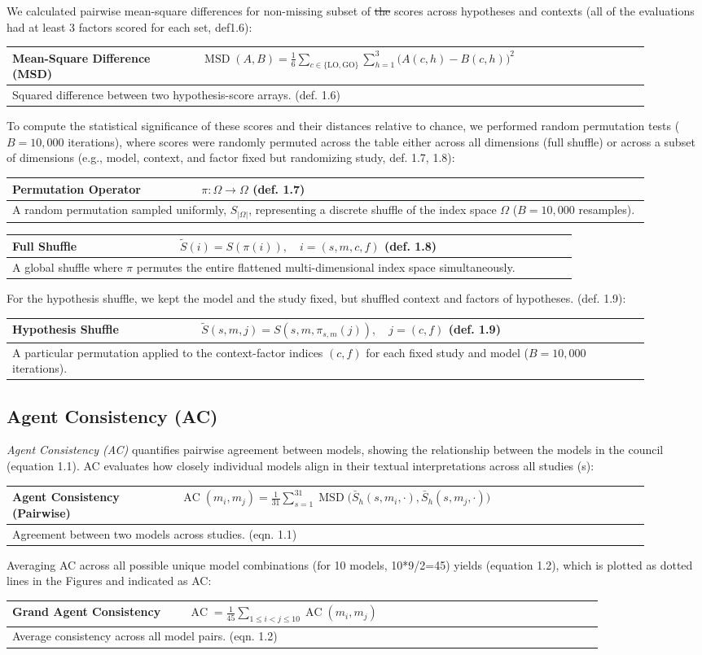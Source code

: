 \documentclass[12pt]{article}
\makeatletter
\renewcommand{\arraystretch}{1.06}
\newcommand{\EquationBox}[3]{%
  \begin{center}
  \begingroup
  \small
  \setlength{\tabcolsep}{6pt}%
  \renewcommand{\arraystretch}{1.18}%
  \begin{tabular}{|p{0.27\linewidth}|p{0.64\linewidth}|}
  \hline
  \textbf{#1} & #2 \\
  \hline
  \multicolumn{2}{|p{0.94\linewidth}|}{#3} \\
  \hline
  \end{tabular}
  \endgroup
  \end{center}
}
\newcommand{\EquationBoxWideLeft}[3]{%
  \begin{center}
  \begingroup
  \small
  \setlength{\tabcolsep}{6pt}%
  \renewcommand{\arraystretch}{1.18}%
  \begin{tabular}{|p{0.24\linewidth}|p{0.67\linewidth}|}
  \hline
  \textbf{#1} & #2 \\
  \hline
  \multicolumn{2}{|p{0.94\linewidth}|}{#3} \\
  \hline
  \end{tabular}
  \endgroup
  \end{center}
}
\providecommand{\DIFaddtex}[1]{{\protect\color{blue}\uwave{#1}}} %
\providecommand{\DIFdeltex}[1]{{\protect\color{red}\sout{#1}}} %
\providecommand{\DIFaddbegin}{} %
\providecommand{\DIFaddend}{} %
\providecommand{\DIFdelbegin}{} %
\providecommand{\DIFdelend}{} %
\providecommand{\DIFadd}[1]{\texorpdfstring{\DIFaddtex{#1}}{#1}} %
\providecommand{\DIFdel}[1]{\texorpdfstring{\DIFdeltex{#1}}{}} %
\providecommand{\DIFscaledelfig}{0.5}
\newlength{\DIFdelgraphicswidth} %
\newlength{\DIFdelgraphicsheight} %
\providecommand{\DIFaddincludegraphics}[2][]{{\color{blue}\fbox{\DIFOincludegraphics[#1]{#2}}}} %
\providecommand{\DIFdelincludegraphics}[2][]{%
\sbox{\DIFdelgraphicsbox}{\DIFOincludegraphics[#1]{#2}}%
\settoboxwidth{\DIFdelgraphicswidth}{\DIFdelgraphicsbox} %
\settoboxtotalheight{\DIFdelgraphicsheight}{\DIFdelgraphicsbox} %
\scalebox{\DIFscaledelfig}{%
\parbox[b]{\DIFdelgraphicswidth}{\usebox{\DIFdelgraphicsbox}\\[-\baselineskip] \rule{\DIFdelgraphicswidth}{0em}}\llap{\resizebox{\DIFdelgraphicswidth}{\DIFdelgraphicsheight}{%
\setlength{\unitlength}{\DIFdelgraphicswidth}%
\begin{picture}(1,1)%
\thicklines\linethickness{2pt} %
{\color[rgb]{1,0,0}\put(0,0){\framebox(1,1){}}}%
{\color[rgb]{1,0,0}\put(0,0){\line( 1,1){1}}}%
{\color[rgb]{1,0,0}\put(0,1){\line(1,-1){1}}}%
\end{picture}%
}\hspace*{3pt}}} %
} %
\DeclareRobustCommand{\DIFaddbegin}{\DIFOaddbegin \let\includegraphics\DIFaddincludegraphics} %
\DeclareRobustCommand{\DIFaddend}{\DIFOaddend \let\includegraphics\DIFOincludegraphics} %
\DeclareRobustCommand{\DIFdelbegin}{\DIFOdelbegin \let\includegraphics\DIFdelincludegraphics} %
\DeclareRobustCommand{\DIFdelend}{\DIFOaddend \let\includegraphics\DIFOincludegraphics} %
\let\sout@orig\sout %
\renewcommand{\sout}[1]{\ifmmode\text{\sout@orig{\ensuremath{#1}}}\else\sout@orig{#1}\fi} %
\makeatother
\begin{document}
\DIFaddend We calculated pairwise mean-square differences for \DIFaddbegin \DIFadd{the }\DIFaddend non-missing subset of \DIFdelbegin \DIFdel{the }\DIFdelend scores across hypotheses and contexts (all of the evaluations had at least 3 factors scored for each set, def\DIFaddbegin \DIFadd{. }\DIFaddend 1.6):
\EquationBox{Mean-Square Difference (MSD)}{\(\displaystyle \operatorname{MSD}(A,B)=\frac{1}{6}\sum_{c\in\{\mathrm{LO},\mathrm{GO}\}}\sum_{h=1}^{3}\bigl(A(c,h)-B(c,h)\bigr)^2\)}{Squared difference between two hypothesis-score arrays. (def. 1.6)}
To compute the statistical significance of these scores and their distances relative to chance, we performed random permutation tests ($B = 10{,}000$ iterations), where scores were randomly permuted across the table either across all dimensions (full shuffle) or across a subset of dimensions (e.g., model, context, and factor fixed but randomizing study, def. 1.7, 1.8):
\EquationBox{Permutation Operator}{\(\pi:\Omega\to\Omega\) (def. 1.7)}{A random permutation sampled uniformly, \(S_{|\Omega|}\), representing a discrete shuffle of the index space \(\Omega\) ($B=10{,}000$ resamples).}
\EquationBox{Full Shuffle}{\(\tilde{S}(i)=S(\pi(i)),\quad i=(s,m,c,f)\) (def. 1.8)}{A global shuffle where \(\pi\) permutes the entire flattened multi-dimensional index space simultaneously.}
For the hypothesis shuffle, we kept the model and the study fixed, but shuffled context and factors of hypotheses. (def. 1.9):
\EquationBox{Hypothesis Shuffle}{\(\tilde{S}(s,m,j)=S(s,m,\pi_{s,m}(j)),\quad j=(c,f)\) (def. 1.9)}{A particular permutation applied to the context-factor indices \((c,f)\) for each fixed study and model ($B=10{,}000$ iterations).}
\subsection{Agent Consistency (AC)}\label{agent-consistency-ac}

\emph{Agent Consistency (AC)} quantifies pairwise agreement between models, showing the relationship between the models in the council (equation 1.1). AC evaluates how closely individual models align in their textual interpretations across all studies (s):
\EquationBoxWideLeft{Agent Consistency (Pairwise)}{\(\displaystyle \operatorname{AC}(m_i,m_j)=\frac{1}{31}\sum_{s=1}^{31}\operatorname{MSD}\bigl(\bar{S}_h(s,m_i,\cdot),\bar{S}_h(s,m_j,\cdot)\bigr)\)}{Agreement between two models across studies. (eqn. 1.1)}
Averaging AC across all possible unique model combinations (for 10 models, 10*9/2=45) yields (equation 1.2), which is plotted as dotted lines in the Figures and indicated as AC:
\EquationBox{Grand Agent Consistency}{\(\displaystyle \operatorname{AC}=\frac{1}{45}\sum_{1\le i<j\le 10}\operatorname{AC}(m_i,m_j)\)}{Average consistency across all model pairs. (eqn. 1.2)}
\end{document}
